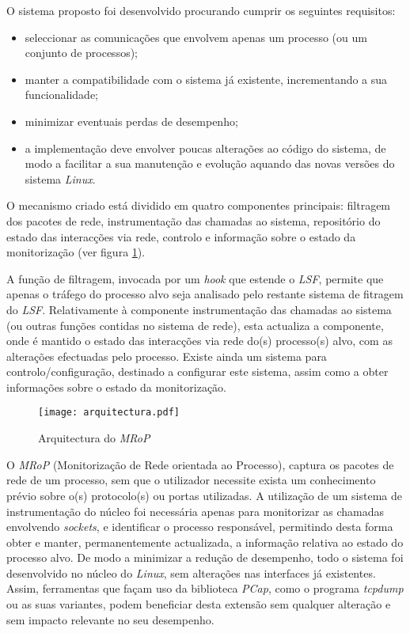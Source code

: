 O sistema proposto foi desenvolvido procurando cumprir os seguintes requisitos:
\begin{itemize}
\item seleccionar as comunicações que envolvem apenas um processo (ou um conjunto de processos);
\item manter a compatibilidade com o sistema já existente, incrementando a sua funcionalidade;
\item minimizar eventuais perdas de desempenho;
\item a implementação deve envolver poucas alterações ao código do sistema, de modo a facilitar a sua manutenção e evolução aquando das novas versões do sistema \textit{Linux}.
\end{itemize}

O mecanismo criado está dividido em quatro componentes principais: filtragem dos pacotes de rede, instrumentação das chamadas ao sistema, repositório do estado das interacções via rede, controlo e informação sobre o estado da monitorização (ver figura \ref{fig:arquitectura}).

A função de filtragem, invocada por um \textit{hook} que estende o \textit{LSF}, permite que apenas o tráfego do processo alvo seja analisado pelo restante sistema de fitragem do \textit{LSF}.
Relativamente à componente instrumentação das chamadas ao sistema (ou outras funções contidas no sistema de rede), esta actualiza a componente, onde é mantido o estado das interacções via rede do(s) processo(s) alvo, com as alterações efectuadas pelo processo.
Existe ainda um sistema para controlo/configuração, destinado a configurar este sistema, assim como a obter informações sobre o estado da monitorização.

\begin{figure}[htbp]
\begin{center}
\texttt{[image: arquitectura.pdf]} 
\caption{Arquitectura do \textit{MRoP}}
\label{fig:arquitectura}
\end{center}
\end{figure}

O \textit{MRoP} (Monitorização de Rede orientada ao Processo), captura os pacotes de rede de um processo, sem que o utilizador necessite exista um conhecimento prévio sobre o(s) protocolo(s) ou portas utilizadas.
A utilização de um sistema de instrumentação do núcleo foi necessária apenas para monitorizar as chamadas envolvendo \textit{sockets}, e identificar o processo responsável, permitindo desta forma obter e manter, permanentemente actualizada, a informação relativa ao estado do processo alvo.
De modo a minimizar a redução de desempenho, todo o sistema foi desenvolvido no núcleo do \textit{Linux}, sem alterações nas interfaces já existentes.
Assim, ferramentas que façam uso da biblioteca \textit{PCap}, como o programa \textit{tcpdump} ou as suas variantes, podem beneficiar desta extensão sem qualquer alteração e sem impacto relevante no seu desempenho.


